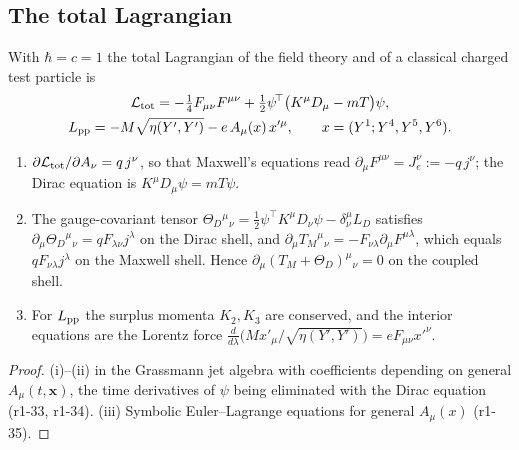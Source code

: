 \subsection{The total Lagrangian}
\label{r1:sec:total}

With $\hbar=c=1$ the total Lagrangian of the field theory and of a classical charged test particle is
\begin{equation}
\label{r1:eq:Ltot}
\begin{gathered}
\mathcal L_{\rm tot}=-\tfrac14F_{\mu\nu}F^{\mu\nu}+\tfrac12\psi^{\!\top}\bigl(K^\mu D_\mu-mT\bigr)\psi,\\
L_{\rm pp}=-M\sqrt{\eta(Y',Y')}-e\,A_\mu(x)\,x'^\mu,\qquad x=(Y^1;Y^4,Y^5,Y^6).
\end{gathered}
\end{equation}

\begin{proposition}
\label{r1:prop:total}
\begin{enumerate}[label=(\roman*),leftmargin=2.2em]
\item $\partial\mathcal L_{\rm tot}/\partial A_\nu=q\,j^\nu$, so that Maxwell's equations read $\partial_\mu F^{\mu\nu}=J_e^\nu:=-q\,j^\nu$;
the Dirac equation is $K^\mu D_\mu\psi=mT\psi$.
\item The gauge-covariant tensor $\Theta_D{}^\mu{}_\nu=\tfrac12\psi^{\!\top}K^\mu D_\nu\psi-\delta^\mu_\nu L_D$ satisfies
$\partial_\mu\Theta_D{}^\mu{}_\nu=qF_{\lambda\nu}j^\lambda$ on the Dirac shell, and $\partial_\mu T_M{}^\mu{}_\nu=-F_{\nu\lambda}\partial_\mu F^{\mu\lambda}$,
which equals $qF_{\nu\lambda}j^\lambda$ on the Maxwell shell. Hence $\partial_\mu(T_M+\Theta_D)^\mu{}_\nu=0$ on the coupled shell.
\item For $L_{\rm pp}$ the surplus momenta $K_2,K_3$ are conserved, and the interior equations are the Lorentz force
$\frac{d}{d\lambda}\bigl(Mx'_\mu/\sqrt{\eta(Y',Y')}\bigr)=eF_{\mu\nu}x'^\nu$.
\end{enumerate}
\end{proposition}

\begin{proof}
(i)--(ii) in the Grassmann jet algebra with coefficients depending on general $A_\mu(t,\mathbf x)$, the time derivatives of $\psi$ being
eliminated with the Dirac equation (r1-33, r1-34). (iii) Symbolic Euler--Lagrange equations for general $A_\mu(x)$ (r1-35).
\end{proof}

